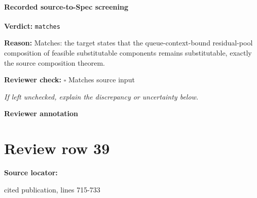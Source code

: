 \documentclass[10pt]{article}
\newcommand{\reviewerbox}{%
  \par\noindent\fbox{\parbox{0.96\linewidth}{\rule{0pt}{0.38in}}}\par
}
\newcommand{\reviewmatch}[1]{%
  \par\noindent\textbf{Reviewer check:} $\square$\; #1\par
  \noindent\emph{If left unchecked, explain the discrepancy or uncertainty below.}\par
}
\begin{document}
\paragraph{Recorded source-to-Spec screening}
\textbf{Verdict:} \texttt{matches}
\\
{\raggedright
\textbf{Reason:} Matches:\allowbreak{} the target states that the queue-\allowbreak{}context-\allowbreak{}bound residual-\allowbreak{}pool composition of feasible substitutable components remains substitutable, exactly the source composition theorem.\allowbreak{}
\par}
\reviewmatch{Matches source input}
\noindent\textbf{Reviewer annotation}\par
\reviewerbox
\clearpage
\hypertarget{source-claim-9d62929dd8983c5f}{}
\section*{Review row 39}
\textbf{Source locator:} {\footnotesize\raggedright cited publication, lines 715-\allowbreak{}733\par}
\end{document}
